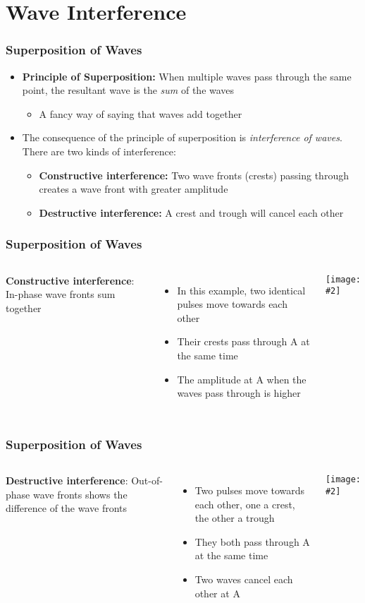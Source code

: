 \documentclass[12pt,aspectratio=169]{beamer}
\newcommand{\pic}[2]{\texttt{[image: \#2]}}
\begin{document}
\section[Interference]{Wave Interference}
\begin{frame}
  \frametitle{Superposition of Waves}
  \begin{itemize}
  \item\textbf{Principle of Superposition:} When multiple waves pass through
    the same point, the resultant wave is the \emph{sum} of the waves
    \begin{itemize}
    \item A fancy way of saying that waves add together
    \end{itemize}
  \item The consequence of the principle of superposition is
    \emph{interference of waves}. There are two kinds of interference:
    \begin{itemize}
    \item\textbf{Constructive interference:} Two wave fronts (crests) passing
      through creates a wave front with greater amplitude
    \item\textbf{Destructive interference:} A crest and trough will cancel
      each other
    \end{itemize}
  \end{itemize}
\end{frame}


\begin{frame}
  \frametitle{Superposition of Waves}
  \begin{columns}
    \textbf{Constructive interference}: In-phase wave fronts sum together
    \begin{itemize}
    \item In this example, two identical pulses move towards each other
    \item Their crests pass through A at the same time
    \item The amplitude at A when the waves pass through is higher 
    \end{itemize}
    
    \pic{1}{constructive.png}
  \end{columns}
\end{frame}

\begin{frame}
  \frametitle{Superposition of Waves}
  \begin{columns}
    \textbf{Destructive interference}: Out-of-phase wave fronts shows the
    difference of the wave fronts
    \begin{itemize}
    \item Two pulses move towards each other, one a crest, the other a trough
    \item They both pass through A at the same time
    \item Two waves cancel each other at A
    \end{itemize}
        
    \pic{1}{destructive.png}
  \end{columns}
\end{frame}
\end{document}
